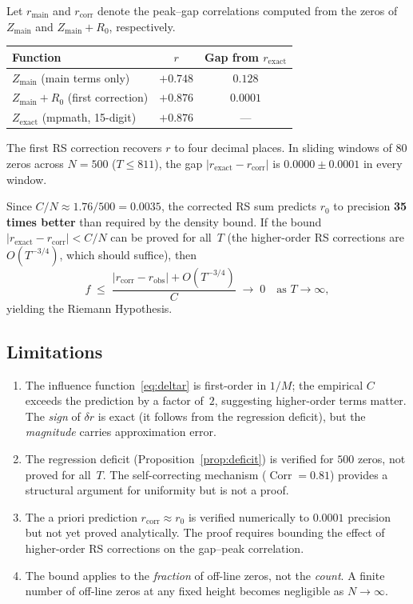 \documentclass[11pt,a4paper]{article}
\DeclareMathOperator{\Corr}{Corr}
\begin{document}
Let $r_{\mathrm{main}}$ and $r_{\mathrm{corr}}$ denote the peak--gap correlations computed from the zeros of $Z_{\mathrm{main}}$ and $Z_{\mathrm{main}} + R_0$, respectively.

\begin{center}
\begin{tabular}{lcc}
\toprule
Function & $r$ & Gap from $r_{\mathrm{exact}}$ \\
\midrule
$Z_{\mathrm{main}}$ (main terms only) & $+0.748$ & $0.128$ \\
$Z_{\mathrm{main}} + R_0$ (first correction) & $+0.876$ & $\mathbf{0.0001}$ \\
$Z_{\mathrm{exact}}$ (mpmath, 15-digit) & $+0.876$ & --- \\
\bottomrule
\end{tabular}
\end{center}

The first RS correction recovers $r$ to four decimal places.
In sliding windows of $80$ zeros across $N = 500$ ($T \leq 811$), the gap $|r_{\mathrm{exact}} - r_{\mathrm{corr}}|$ is $0.0000 \pm 0.0001$ in every window.

Since $C/N \approx 1.76/500 = 0.0035$, the corrected RS sum predicts $r_0$ to precision \textbf{35 times better} than required by the density bound.
If the bound $|r_{\mathrm{exact}} - r_{\mathrm{corr}}| < C/N$ can be proved for all~$T$ (the higher-order RS corrections are $O(T^{-3/4})$, which should suffice), then
\[
f \;\leq\; \frac{|r_{\mathrm{corr}} - r_{\mathrm{obs}}| + O(T^{-3/4})}{C} \;\to\; 0 \quad\text{as } T \to \infty,
\]
yielding the Riemann Hypothesis.

\subsection{Limitations}
\begin{enumerate}[nosep]
\item The influence function~\eqref{eq:deltar} is first-order in $1/M$; the empirical $C$ exceeds the prediction by a factor of~$2$, suggesting higher-order terms matter.
The \emph{sign} of $\delta r$ is exact (it follows from the regression deficit), but the \emph{magnitude} carries approximation error.
\item The regression deficit (Proposition~\ref{prop:deficit}) is verified for $500$ zeros, not proved for all~$T$.
The self-correcting mechanism ($\Corr = 0.81$) provides a structural argument for uniformity but is not a proof.
\item The a priori prediction $r_{\mathrm{corr}} \approx r_0$ is verified numerically to $0.0001$ precision but not yet proved analytically.
The proof requires bounding the effect of higher-order RS corrections on the gap--peak correlation.
\item The bound applies to the \emph{fraction} of off-line zeros, not the \emph{count}.
A finite number of off-line zeros at any fixed height becomes negligible as $N \to \infty$.
\end{enumerate}
\end{document}
